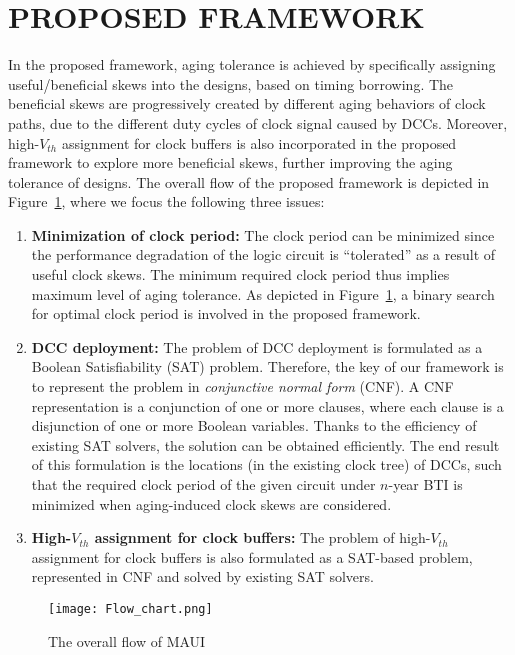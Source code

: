 \section{PROPOSED FRAMEWORK}
\label{sec:framework}
In the proposed framework, aging tolerance is achieved by specifically assigning useful/beneficial skews into the designs, based on timing borrowing. The beneficial skews are progressively created by different aging behaviors of clock paths, due to the different duty cycles of clock signal caused by DCCs. Moreover, high-$V_{th}$ assignment for clock buffers is also incorporated in the proposed framework to explore more beneficial skews, further improving the aging tolerance of designs.
The overall flow of the proposed framework is depicted in Figure~\ref{fig:flow}, where we focus the following three issues:
\begin{enumerate}[leftmargin=*]
	\item \textbf{Minimization of clock period:} The clock period can be minimized since the performance degradation of the logic circuit is \enquote{tolerated} as a result of useful clock skews. The minimum required clock period thus implies maximum level of aging tolerance. As depicted in Figure~\ref{fig:flow}, a binary search for optimal clock period is involved in the proposed framework.
	\item \textbf{DCC deployment:} The problem of  DCC deployment is formulated as a Boolean Satisfiability (SAT) problem. Therefore, the key of our framework is to represent the problem in \textit{conjunctive normal form} (CNF). A CNF representation is a conjunction of one or more clauses, where each clause is a disjunction of one or more Boolean variables. Thanks to the efficiency of existing SAT solvers, the solution can be obtained efficiently. The end result of this formulation is the locations (in the existing clock tree) of DCCs, such that the required clock period of the given circuit under $n$-year BTI is minimized when aging-induced clock skews are considered. 
	\item \textbf{High-$V_{th}$ assignment for clock buffers:} The problem of high-$V_{th}$ assignment for clock buffers is also formulated as a SAT-based problem, represented in CNF and solved by existing SAT solvers.
\end{enumerate}

\begin{figure}
	\texttt{[image: Flow\_chart.png]} %
	\caption{The overall flow of MAUI}
	\label{fig:flow}
\end{figure}
 

